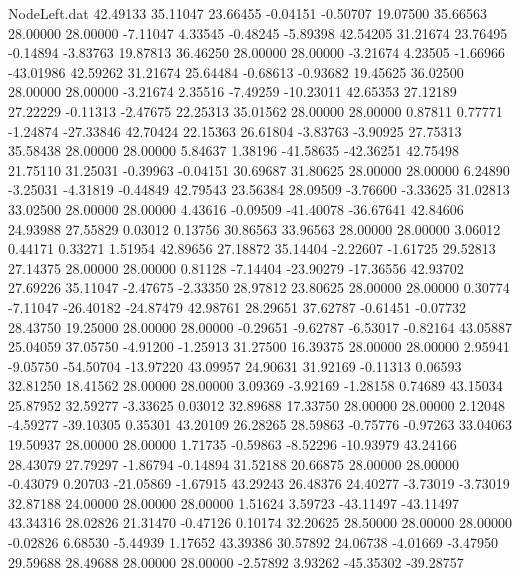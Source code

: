 \begin{filecontents}{NodeLeft.dat}
  42.49133   35.11047   23.66455    -0.04151   -0.50707   19.07500   35.66563   28.00000   28.00000   -7.11047    4.33545   -0.48245   -5.89398
  42.54205   31.21674   23.76495    -0.14894   -3.83763   19.87813   36.46250   28.00000   28.00000   -3.21674    4.23505   -1.66966  -43.01986
  42.59262   31.21674   25.64484    -0.68613   -0.93682   19.45625   36.02500   28.00000   28.00000   -3.21674    2.35516   -7.49259  -10.23011
  42.65353   27.12189   27.22229    -0.11313   -2.47675   22.25313   35.01562   28.00000   28.00000    0.87811    0.77771   -1.24874  -27.33846
  42.70424   22.15363   26.61804    -3.83763   -3.90925   27.75313   35.58438   28.00000   28.00000    5.84637    1.38196  -41.58635  -42.36251
  42.75498   21.75110   31.25031    -0.39963   -0.04151   30.69687   31.80625   28.00000   28.00000    6.24890   -3.25031   -4.31819   -0.44849
  42.79543   23.56384   28.09509    -3.76600   -3.33625   31.02813   33.02500   28.00000   28.00000    4.43616   -0.09509  -41.40078  -36.67641
  42.84606   24.93988   27.55829     0.03012    0.13756   30.86563   33.96563   28.00000   28.00000    3.06012    0.44171    0.33271    1.51954
  42.89656   27.18872   35.14404    -2.22607   -1.61725   29.52813   27.14375   28.00000   28.00000    0.81128   -7.14404  -23.90279  -17.36556
  42.93702   27.69226   35.11047    -2.47675   -2.33350   28.97812   23.80625   28.00000   28.00000    0.30774   -7.11047  -26.40182  -24.87479
  42.98761   28.29651   37.62787    -0.61451   -0.07732   28.43750   19.25000   28.00000   28.00000   -0.29651   -9.62787   -6.53017   -0.82164
  43.05887   25.04059   37.05750    -4.91200   -1.25913   31.27500   16.39375   28.00000   28.00000    2.95941   -9.05750  -54.50704  -13.97220
  43.09957   24.90631   31.92169    -0.11313    0.06593   32.81250   18.41562   28.00000   28.00000    3.09369   -3.92169   -1.28158    0.74689
  43.15034   25.87952   32.59277    -3.33625    0.03012   32.89688   17.33750   28.00000   28.00000    2.12048   -4.59277  -39.10305    0.35301
  43.20109   26.28265   28.59863    -0.75776   -0.97263   33.04063   19.50937   28.00000   28.00000    1.71735   -0.59863   -8.52296  -10.93979
  43.24166   28.43079   27.79297    -1.86794   -0.14894   31.52188   20.66875   28.00000   28.00000   -0.43079    0.20703  -21.05869   -1.67915
  43.29243   26.48376   24.40277    -3.73019   -3.73019   32.87188   24.00000   28.00000   28.00000    1.51624    3.59723  -43.11497  -43.11497
  43.34316   28.02826   21.31470    -0.47126    0.10174   32.20625   28.50000   28.00000   28.00000   -0.02826    6.68530   -5.44939    1.17652
  43.39386   30.57892   24.06738    -4.01669   -3.47950   29.59688   28.49688   28.00000   28.00000   -2.57892    3.93262  -45.35302  -39.28757

\end{filecontents}
